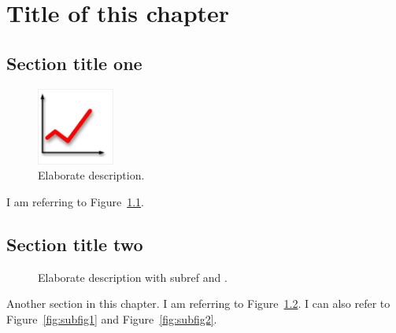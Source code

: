 \chapter{Title of this chapter}
\label{chp:1}

\section{Section title one}
\label{sec:1.1}

\begin{figure}[tbh]
  \centering
  \includegraphics[width=1in]{img.eps}
  \caption[Simple description for list of figures]
  {Elaborate description.}
  \label{fig:img1}
\end{figure}

I am referring to Figure~\ref{fig:img1}.

\section{Section title two}
\label{sec:1.2}

\begin{figure}[tbh]
\centerline{
  \hfil
}
\caption[Simple description for list of figures]
  {Elaborate description with subref  and
   .}
\label{fig:img2}
\end{figure}

Another section in this chapter.  I am referring to Figure~\ref{fig:img2}.
I can also refer to Figure~\ref{fig:subfig1} and Figure~\ref{fig:subfig2}.
